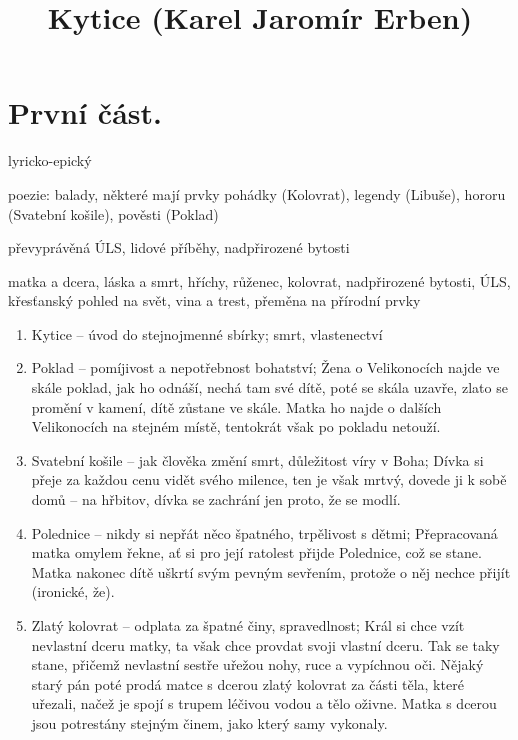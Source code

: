 \documentclass{article}
\title{\vspace{-2cm}Kytice (Karel Jaromír Erben)\vspace{-2cm}}
\date{}
\author{}
\begin{document}
\maketitle
\section{První část.}
\begin{description}
    \setlength\itemsep{0.15em}
    \item[druh:] lyricko-epický
    \item[žánr:] poezie: balady, některé mají prvky pohádky (Kolovrat), legendy (Libuše), hororu (Svatební košile), pověsti (Poklad)
    \item[téma:] převyprávěná ÚLS, lidové příběhy, nadpřirozené bytosti
    \item[motivy všech:] matka a dcera, láska a smrt, hříchy, růženec, kolovrat, nadpřirozené bytosti, ÚLS, křesťanský pohled na svět, vina a trest, přeměna na přírodní prvky
    \begin{enumerate}
        \vspace{-0.5em}
        \setlength\itemsep{0.15em}
        \item Kytice -- úvod do stejnojmenné sbírky; smrt, vlastenectví
        \item Poklad -- pomíjivost a nepotřebnost bohatství; Žena o Velikonocích najde ve skále poklad, jak ho odnáší, nechá tam své dítě, poté se skála uzavře, zlato se promění v kamení, dítě zůstane ve skále. Matka ho najde o dalších Velikonocích na stejném místě, tentokrát však po pokladu netouží.
        \item Svatební košile -- jak člověka změní smrt, důležitost víry v Boha; Dívka si přeje za každou cenu vidět svého milence, ten je však mrtvý, dovede ji k sobě domů -- na hřbitov, dívka se zachrání jen proto, že se modlí.
        \item Polednice -- nikdy si nepřát něco špatného, trpělivost s dětmi; Přepracovaná matka omylem řekne, ať si pro její ratolest přijde Polednice, což se stane. Matka nakonec dítě uškrtí svým pevným sevřením, protože o něj nechce přijít (ironické, že).
        \item Zlatý kolovrat -- odplata za špatné činy, spravedlnost; Král si chce vzít nevlastní dceru matky, ta však chce provdat svoji vlastní dceru. Tak se taky stane, přičemž nevlastní sestře uřežou nohy, ruce a vypíchnou oči. Nějaký starý pán poté prodá matce s dcerou zlatý kolovrat za části těla, které uřezali, načež je spojí s trupem léčivou vodou a tělo oživne. Matka s dcerou jsou potrestány stejným činem, jako který samy vykonaly.

\end{enumerate}
\end{description}
\end{document}
